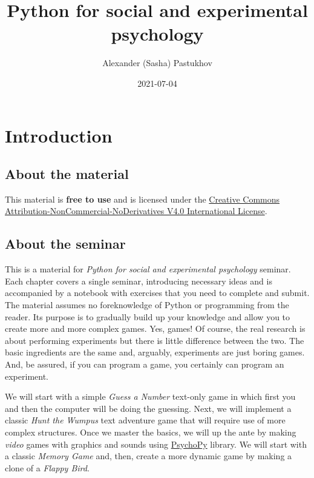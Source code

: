 \documentclass[
]{book}
\title{Python for social and experimental psychology}
\author{Alexander (Sasha) Pastukhov}
\date{2021-07-04}
\begin{document}
\maketitle

{
\setcounter{tocdepth}{1}
\tableofcontents
}
\hypertarget{introduction}{%
\chapter*{Introduction}\label{introduction}}

\hypertarget{about-the-material}{%
\section*{About the material}\label{about-the-material}}

This material is \textbf{free to use} and is licensed under the \href{https://creativecommons.org/licenses/by-nc-nd/4.0/}{Creative Commons Attribution-NonCommercial-NoDerivatives V4.0 International License}.

\hypertarget{about-the-seminar}{%
\section*{About the seminar}\label{about-the-seminar}}

This is a material for \emph{Python for social and experimental psychology} seminar. Each chapter covers a single seminar, introducing necessary ideas and is accompanied by a notebook with exercises that you need to complete and submit. The material assumes no foreknowledge of Python or programming from the reader. Its purpose is to gradually build up your knowledge and allow you to create more and more complex games. Yes, games! Of course, the real research is about performing experiments but there is little difference between the two. The basic ingredients are the same and, arguably, experiments are just boring games. And, be assured, if you can program a game, you certainly can program an experiment.

We will start with a simple \emph{Guess a Number} text-only game in which first you and then the computer will be doing the guessing. Next, we will implement a classic \emph{Hunt the Wumpus} text adventure game that will require use of more complex structures. Once we master the basics, we will up the ante by making \emph{video} games with graphics and sounds using \href{https://psychopy.org/}{PsychoPy} library. We will start with a classic \emph{Memory Game} and, then, create a more dynamic game by making a clone of a \emph{Flappy Bird}.
\end{document}
